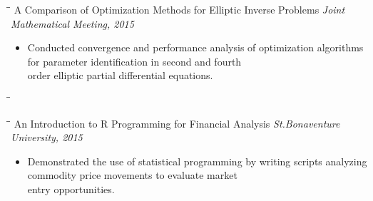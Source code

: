 \documentclass{res}
\begin{document}
\begin{resume}
%
 \vspace{-15 pt}     %
\begin{tabbing}
   \hspace{2.3in}\= \hspace{1.6in}\= \kill %
    A Comparison of Optimization Methods for Elliptic Inverse Problems \hspace{90 pt} \textit{Joint Mathematical Meeting, 2015}  
   \end{tabbing}
  \vspace{-10 pt}     %
\begin{itemize}
\item Conducted convergence and performance analysis of  optimization algorithms for parameter identification in second and fourth\\ order elliptic partial differential equations.
\end{itemize}
 \vspace{-15 pt}     %
 \begin{tabbing}
   \hspace{2.3in}\= \hspace{1.6in}\= \kill %
   \end{tabbing}\vspace{-45 pt}  
 \begin{tabbing}
   \hspace{2.3in}\= \hspace{1.6in}\= \kill %
 An Introduction to R Programming for Financial Analysis \hspace{138 pt} \textit{St.Bonaventure University, 2015}
   \end{tabbing}
  \vspace{-10 pt}     %
\begin{itemize}
\item Demonstrated the use of statistical programming by writing scripts analyzing commodity price movements to evaluate market\\ entry opportunities.
\end{itemize}
 \vspace{-15 pt}     %
 

\end{resume}
\end{document}
